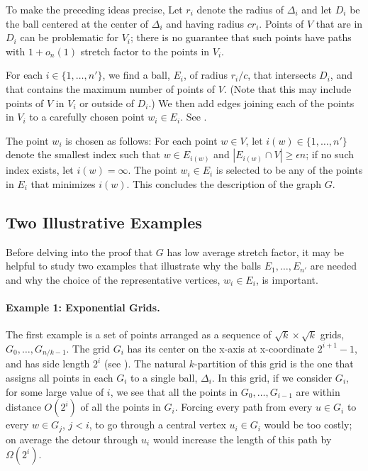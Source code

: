 \documentclass{patmorin}
\begin{document}
To make the preceding ideas precise, Let $r_i$ denote the radius
of $\Delta_i$ and let $D_i$ be the ball centered at the center of
$\Delta_i$ and having radius $cr_i$.  Points of $V$ that are in $D_i$
can be problematic for $V_i$; there is no guarantee that such points
have paths with $1+o_n(1)$ stretch factor to the points in $V_i$.

For each $i\in\{1,\ldots,n'\}$, we find a ball, $E_i$, of radius $r_i/c$,
that intersects $D_i$, and that contains the maximum number of points
of $V$.  (Note that this may include points of $V$ in $V_i$ or outside
of $D_i$.)  We then add edges joining each of the points in $V_i$ to
a carefully chosen point $w_i\in E_i$.  See .

The point $w_i$ is chosen as follows: For each point $w\in V$, let
$i(w)\in \{1,\ldots,n'\}$ denote the smallest index such that $w\in
E_{i(w)}$ and $|E_{i(w)}\cap V| \ge \epsilon n$; if no such index exists,
let $i(w)=\infty$.  The point $w_i\in E_i$ is selected to be any of the
points in $E_i$ that minimizes $i(w)$.  This concludes the description
of the graph $G$.


\subsection{Two Illustrative Examples}
Before delving into the proof that $G$ has low average stretch factor,
it may be helpful to study two examples that illustrate why the balls
$E_1,\ldots,E_{n'}$ are needed and why the choice of the representative
vertices, $w_i\in E_i$, is  important.

\paragraph{Example 1: Exponential Grids.}
The first example is a set of points arranged as a sequence of
$\sqrt{k}\times\sqrt{k}$ grids, $G_0,\ldots,G_{n/k-1}$.  The grid $G_i$
has its center on the x-axis at x-coordinate $2^{i+1}-1$, and has side
length $2^i$ (see ). The natural $k$-partition of this
grid is the one that assigns all points in each $G_i$ to a single ball,
$\Delta_i$.  In this grid, if we consider $G_i$, for some large value
of $i$, we see that all the points in $G_0,\ldots,G_{i-1}$ are within
distance $O(2^{i})$ of all the points in $G_i$.  Forcing every path from
every $u\in G_i$ to every $w\in G_{j}$, $j<i$, to go through a central
vertex $u_i\in G_i$ would be too costly; on average the detour through
$u_i$ would increase the length of this path by $\Omega(2^{i})$.
\end{document}
